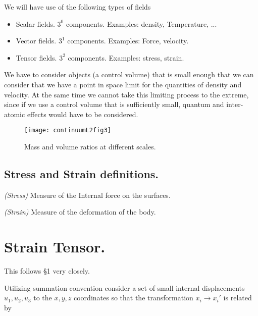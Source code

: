 We will have use of the following types of fields

\begin{itemize}
\item Scalar fields.  $3^0$ components.  Examples: density, Temperature, ...
\item Vector fields.  $3^1$ components.  Examples: Force, velocity.
\item Tensor fields.  $3^2$ components.  Examples: stress, strain.
\end{itemize}

We have to consider objects (a control volume) that is small enough that we can consider that we have a point in space limit for the quantities of density and velocity.  At the same time we cannot take this limiting process to the extreme, since if we use a control volume that is sufficiently small, quantum and inter-atomic effects would have to be considered.

\begin{figure}[htp]
   \centering
   \texttt{[image: continuumL2fig3]}
   \caption{Mass and volume ratios at different scales.}\label{fig:continuumL2:continuumL2fig3}
\end{figure}

\subsection{Stress and Strain definitions.}

\begin{definition}
\emph{(Stress)}
\label{dfn:continuumL2:10}
Measure of the Internal force on the surfaces.
\end{definition}

\begin{definition}
\emph{(Strain)}
\label{dfn:continuumL2:30}
Measure of the deformation of the body.
\end{definition}

\section{Strain Tensor.}

This follows \cite{landau1960theory} \S 1 very closely.

Utilizing summation convention consider a set of small internal displacements $u_1, u_2, u_3$ to the $x, y, z$ coordinates so that the transformation $x_i \rightarrow x_i'$ is related by

